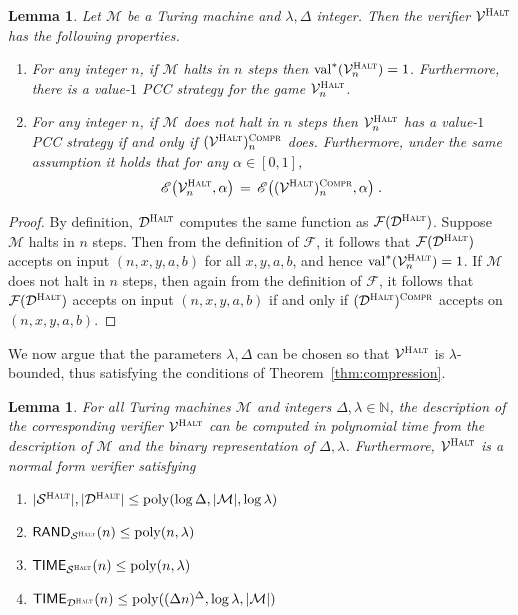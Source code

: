 \documentclass[11pt]{article}
\newtheorem{lemma}[theorem]{Lemma}
\theoremstyle{definition}
\newcommand{\N}{\ensuremath{\mathbb{N}}}
\DeclareMathOperator{\poly}{poly}
\newcommand{\val}{\ensuremath{\mathrm{val}}}
\newcommand{\sampler}{\mathcal{S}}
\newcommand{\decider}{\mathcal{D}}
\newcommand{\verifier}{\mathcal{V}}
\newcommand{\Ent}{\mathscr{E}}
\newcommand{\compr}{\textsc{Compr}}
\newcommand{\halt}{\textsc{Halt}}
\renewcommand{\cal}[1]{\mathcal{#1}}
\newcommand{\TIME}{\mathsf{TIME}}
\newcommand{\RAND}{\mathsf{RAND}}
\begin{document}
\begin{lemma}\label{lem:dhalt-values}
  Let $\cal{M}$ be a Turing machine and $\lambda,\Delta$ integer.
  Then the verifier $\verifier^\halt$ has the following properties.
  \begin{enumerate}
  \item For any integer $n$, if $\cal{M}$ halts in $n$ steps then
    $\val^*(\verifier^\halt_n)=1$.
    Furthermore, there is a value-$1$ PCC strategy for the game
    $\verifier^\halt_n$.
  \item For any integer $n$, if $\cal{M}$ does not halt in $n$ steps then
    $\verifier^\halt_n$ has a value-$1$ PCC strategy if and only if
    $(\verifier^\halt)^{\compr}_n$ does.
    Furthermore, under the same assumption it holds that for any $\alpha \in
    [0,1]$,
    \begin{equation*}
      \Ent\big(\verifier^\halt_n,\alpha\big) \,=\,
      \Ent\big((\verifier^\halt)^{\compr}_n,\alpha\big)\;.
    \end{equation*}
  \end{enumerate}
\end{lemma}
		
\begin{proof}
  By definition, $\decider^\halt$ computes the same function as
  $\cal{F}(\decider^\halt)$.
  Suppose $\cal{M}$ halts in $n$ steps.
  Then from the definition of $\cal{F}$, it follows that
  $\cal{F}(\decider^{\halt})$ accepts on input $(n, x, y, a, b)$ for all
  $x,y,a,b$, and hence $\val^*(\verifier^\halt_n) = 1$.
  If $\cal{M}$ does not halt in $n$ steps, then again from the definition of
  $\cal{F}$, it follows that $\cal{F}(\decider^{\halt})$ accepts on input $(n,
  x, y, a,b)$ if and only if $(\decider^{\halt})^{\compr}$ accepts on $(n, x, y,
  a,b)$.
\end{proof}
		
We now argue that the parameters $\lambda, \Delta$ can be chosen so that
$\verifier^\halt$ is $\lambda$-bounded, thus satisfying the conditions of
Theorem~\ref{thm:compression}.

\begin{lemma}
  \label{lem:halt-complexity-ub}
  For all Turing machines $\cal{M}$ and integers $\Delta, \lambda \in \N$, the
  description of the corresponding verifier $\verifier^\halt$ can be computed in
  polynomial time from the description of $\cal{M}$ and the binary
  representation of $\Delta, \lambda$.
  Furthermore, $\verifier^\halt$ is a normal form verifier satisfying
  \begin{enumerate}
	\item $|\sampler^\halt|,|\decider^\halt| \leq \poly(\log \Delta,|\cal{M}|,\log
    \lambda)$
	\item $\RAND_{\sampler^\halt}(n) \leq \poly (n,\lambda)$
	\item $\TIME_{\sampler^\halt}(n) \leq \poly (n,\lambda)$
	\item $\TIME_{\decider^\halt}(n) \leq \poly((\Delta n)^\Delta, \log
    \lambda,|\cal{M}|)$
  \end{enumerate}
\end{lemma}
\end{document}
